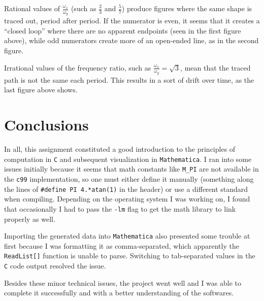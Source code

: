 \documentclass{article}
\begin{document}
Rational values of $\frac{\omega_x}{\omega_y}$ (such as $\frac{2}{3}$ and $\frac{5}{7}$) produce figures where the same shape is traced out, period after period. If the numerator is even, it seems that it creates a ``closed loop'' where there are no apparent endpoints (seen in the first figure above), while odd numerators create more of an open-ended line, as in the second figure.

Irrational values of the frequency ratio, such as $\frac{\omega_x}{\omega_y}=\sqrt{3}$, mean that the traced path is not the same each period. This results in a sort of drift over time, as the last figure above shows.

\section{Conclusions}

In all, this assignment constituted a good introduction to the principles of computation in \texttt{C} and subsequent visualization in \texttt{Mathematica}. I ran into some issues initially because it seems that math constants like \texttt{M\_PI} are not available in the \texttt{c99} implementation, so one must either define it manually (something along the lines of \texttt{\#define PI 4.*atan(1)} in the header) or use a different standard when compiling. Depending on the operating system I was working on, I found that occasionally I had to pass the \texttt{-lm} flag to get the math library to link properly as well.

Importing the generated data into \texttt{Mathematica} also presented some trouble at first because I was formatting it as comma-separated, which apparently the \texttt{ReadList[]} function is unable to parse. Switching to tab-separated values in the \texttt{C} code output resolved the issue.

Besides these minor technical issues, the project went well and I was able to complete it successfully and with a better understanding of the softwares.
\end{document}
